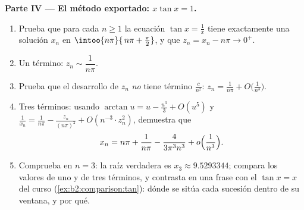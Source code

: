 \begin{problem}
\medskip
\noindent\textbf{Parte IV --- El método exportado: $x\tan x = 1$.}
\begin{enumerate}[resume]
  \item Prueba que para cada $n \geq 1$ la ecuación $\tan x =
        \frac1x$ tiene exactamente una solución $x_n$ en
        $\intoo{n\pi}{\,n\pi + \frac\pi2}$, y que $z_n = x_n - n\pi
        \to 0^+$.
  \item Un término: $z_n \sim \dfrac{1}{n\pi}$.
  \item Prueba que el desarrollo de $z_n$ \emph{no} tiene término
        $\frac{c}{n^2}$: $z_n = \frac1{n\pi} +
        O\bigl(\frac{1}{n^3}\bigr)$.
  \item Tres términos: usando $\arctan u = u - \frac{u^3}3 +
        O(u^5)$ y $\frac1{x_n} = \frac{1}{n\pi} -
        \frac{z_n}{(n\pi)^2} + O(n^{-3}\cdot z_n^2)$, demuestra que
        \[
        x_n = n\pi + \frac{1}{n\pi} -
        \frac{4}{3\pi^3 n^3} + o\Bigl(\frac{1}{n^3}\Bigr).
        \]
  \item Comprueba en $n = 3$: la raíz verdadera es $x_3 \approx
        9.5293344$; compara los valores de uno y de tres términos, y
        contrasta en una frase con el $\tan x = x$ del curso
        (\cref{ex:b2:comparison:tan}): dónde se sitúa cada sucesión
        dentro de su ventana, y por qué.
\end{enumerate}


\end{problem}
